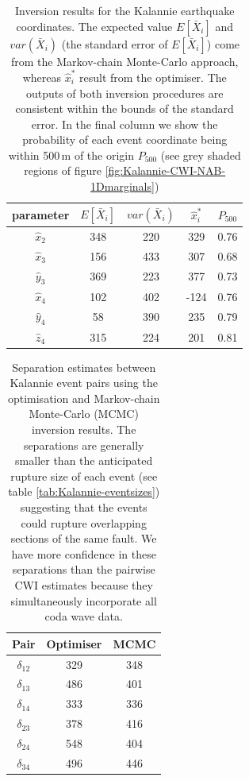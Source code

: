 \documentclass[grl]{agutex}
\begin{document}
\begin{table}
\caption{Inversion results for the Kalannie earthquake coordinates. The expected value $E[\bar{X}_i]$
and $var(\bar{X}_i)$ (the standard error of $E[\bar{X}_i]$) come from the Markov-chain Monte-Carlo approach, whereas
$\hat{x}_i^*$ result from the optimiser. The
outputs of both inversion procedures are consistent within the bounds of the standard error.
In the final column we show the probability of each event coordinate being within 500\,m of the origin $P_{500}$ (see grey
shaded regions of figure \ref{fig:Kalannie-CWI-NAB-1Dmarginals})}
\label{tab:Kalannie-InversionRes}
\renewcommand{\arraystretch}{1.5}
\begin{tabular}{c|cc|c|c}
\hline
parameter & $E[\bar{X}_i]$ &  $var(\bar{X}_i)$  & $\hat{x}_i^*$ & $P_{500}$\\
\hline
$\hat{x}_2$ & 348 & 220 & 329 & 0.76 \\
\hline
$\hat{x}_3$ & 156 & 433 & 307 & 0.68\\
$\hat{y}_3$ & 369 & 223 & 377 & 0.73\\
\hline
$\hat{x}_4$ & 102 & 402 & -124 & 0.76\\
$\hat{y}_4$ & 58 & 390 & 235 & 0.79\\
$\hat{z}_4$ & 315 & 224 & 201 & 0.81\\
\hline
\end{tabular}
\renewcommand{\arraystretch}{1}
\end{table}

\begin{table}
\caption{Separation estimates between Kalannie event pairs using
the optimisation and Markov-chain Monte-Carlo (MCMC) inversion
results. The separations are generally smaller
than the anticipated rupture size of each event (see table \ref{tab:Kalannie-eventsizes}) suggesting that
the events could rupture overlapping sections of the same fault. We have
more confidence in these separations than the pairwise CWI estimates because they
simultaneously incorporate all coda wave data.}
\label{tab:-KalannieRes-separations}
\begin{tabular}{c|cc}
\hline
Pair & Optimiser & MCMC \\
\hline
$\delta_{12}$ & 329 & 348 \\
$\delta_{13}$ & 486 & 401 \\
$\delta_{14}$ & 333 & 336 \\
$\delta_{23}$ & 378 & 416 \\
$\delta_{24}$ & 548 & 404 \\
$\delta_{34}$ & 496 & 446 \\
\hline
\end{tabular}
\end{table}
\end{document}
